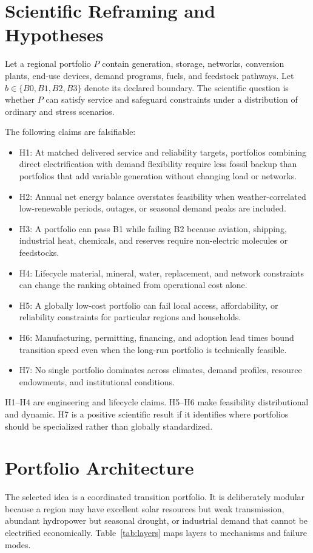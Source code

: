 \documentclass[conference]{IEEEtran}
\begin{document}
\section{Scientific Reframing and Hypotheses}
\label{sec:hyp}
Let a regional portfolio $P$ contain generation, storage, networks, conversion plants, end-use devices, demand programs, fuels, and feedstock pathways. Let $b\in\{B0,B1,B2,B3\}$ denote its declared boundary. The scientific question is whether $P$ can satisfy service and safeguard constraints under a distribution of ordinary and stress scenarios.

The following claims are falsifiable:
\begin{itemize}
\item H1: At matched delivered service and reliability targets, portfolios combining direct electrification with demand flexibility require less fossil backup than portfolios that add variable generation without changing load or networks.
\item H2: Annual net energy balance overstates feasibility when weather-correlated low-renewable periods, outages, or seasonal demand peaks are included.
\item H3: A portfolio can pass B1 while failing B2 because aviation, shipping, industrial heat, chemicals, and reserves require non-electric molecules or feedstocks.
\item H4: Lifecycle material, mineral, water, replacement, and network constraints can change the ranking obtained from operational cost alone.
\item H5: A globally low-cost portfolio can fail local access, affordability, or reliability constraints for particular regions and households.
\item H6: Manufacturing, permitting, financing, and adoption lead times bound transition speed even when the long-run portfolio is technically feasible.
\item H7: No single portfolio dominates across climates, demand profiles, resource endowments, and institutional conditions.
\end{itemize}

H1--H4 are engineering and lifecycle claims. H5--H6 make feasibility distributional and dynamic. H7 is a positive scientific result if it identifies where portfolios should be specialized rather than globally standardized.

\section{Portfolio Architecture}
\label{sec:portfolio}
The selected idea is a coordinated transition portfolio. It is deliberately modular because a region may have excellent solar resources but weak transmission, abundant hydropower but seasonal drought, or industrial demand that cannot be electrified economically. Table~\ref{tab:layers} maps layers to mechanisms and failure modes.
\end{document}
